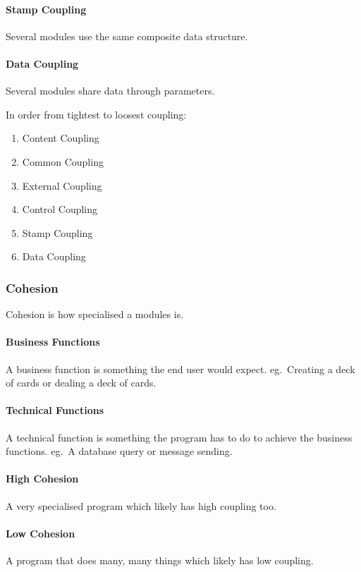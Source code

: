 \paragraph{Stamp Coupling}\label{par:stamp_coupling}

Several modules use the same composite data structure.

\paragraph{Data Coupling}\label{par:data_coupling}

Several modules share data through parameters.

\noindent
In order from tightest to loosest coupling:

\begin{enumerate}
    \item Content Coupling
    \item Common Coupling
    \item External Coupling
    \item Control Coupling
    \item Stamp Coupling
    \item Data Coupling
\end{enumerate}

\subsubsection{Cohesion}\label{ssub:cohesion}

Cohesion is how specialised a modules is.

\paragraph{Business Functions}\label{par:business_functions}

A business function is something the end user would expect. eg.\ Creating a deck of cards or dealing a deck of cards.

\paragraph{Technical Functions}\label{par:technical_fucntions}

A technical function is something the program has to do to achieve the business functions. eg.\ A database query or message sending.

\paragraph{High Cohesion}\label{par:high_cohesion}

A very specialised program which likely has high coupling too.

\paragraph{Low Cohesion}\label{par:low_cohesion}

A program that does many, many things which likely has low coupling.
